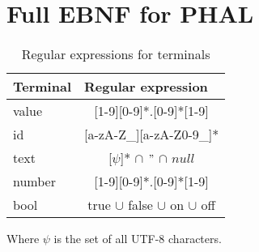 \chapter{Full EBNF for PHAL}\label{BNF:BNF}
\begin{table}[H]
\centering
\begin{tabular}{@{}lc@{}}
\toprule
\textbf{Terminal}   & \multicolumn{1}{l}{\textbf{Regular expression}} \\ \midrule
value            & [1-9][0-9]*.[0-9]*[1-9]                            \\
id               & [a-zA-Z\_][a-zA-Z0-9\_]*                 \\
text             & [$\psi$]* $\cap$ $"$ $\cap$ $null$                                \\
number           & [1-9][0-9]*.[0-9]*[1-9]                            \\
bool             & true $\cup$ false $\cup$ on $\cup$ off   \\
\bottomrule
\end{tabular}
\caption{Regular expressions for terminals}
\label{table:Tokens}
\end{table}
\noindent
Where $\psi$ is the set of all UTF-8 characters.

